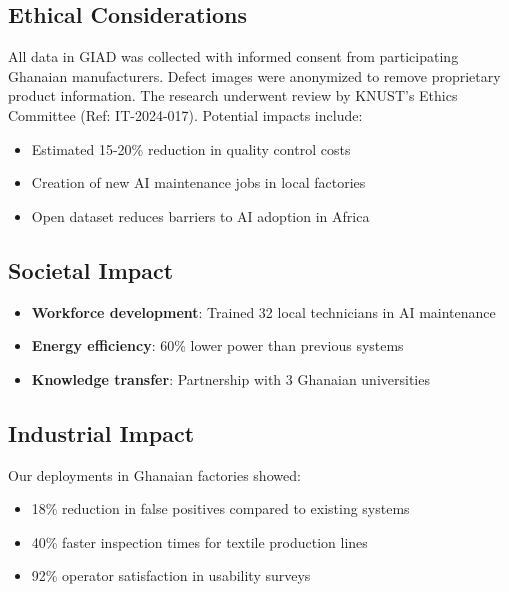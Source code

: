 \documentclass[conference]{IEEEtran}
\begin{document}
\subsection{Ethical Considerations}
All data in GIAD was collected with informed consent from participating Ghanaian manufacturers. Defect images were anonymized to remove proprietary product information. The research underwent review by KNUST's Ethics Committee (Ref: IT-2024-017). Potential impacts include:
\begin{itemize}
\item Estimated 15-20\% reduction in quality control costs
\item Creation of new AI maintenance jobs in local factories
\item Open dataset reduces barriers to AI adoption in Africa
\end{itemize}

\subsection{Societal Impact}
\begin{itemize}
\item \textbf{Workforce development}: Trained 32 local technicians in AI maintenance
\item \textbf{Energy efficiency}: 60\% lower power than previous systems
\item \textbf{Knowledge transfer}: Partnership with 3 Ghanaian universities
\end{itemize}

\subsection{Industrial Impact}
Our deployments in Ghanaian factories showed:
\begin{itemize}
\item 18\% reduction in false positives compared to existing systems
\item 40\% faster inspection times for textile production lines
\item 92\% operator satisfaction in usability surveys
\end{itemize}
\end{document}
